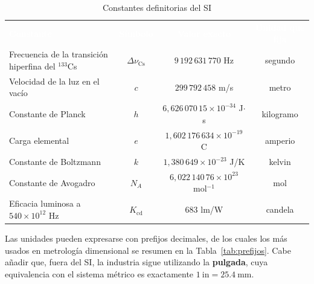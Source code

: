 \documentclass[12pt,a4paper]{article}
\newcommand{\encab}[1]{\textcolor{white}{\sffamily\bfseries #1}}
\begin{document}
\begin{table}[!htb]
	\centering
	\caption{Constantes definitorias del SI}\label{tab:constantes}
	\small
	\begin{tabularx}{\linewidth}{>{\raggedright\arraybackslash}X c c c}
		\rowcolor{darkblue}
		\encab{Constante}                                    & \encab{Símbolo}
		                                                     & \encab{Valor exacto}
		                                                     & \encab{Unidad que
			                                                       fija}
		\\
		Frecuencia de la transición hiperfina del $^{133}$Cs &
		$\Delta\nu_{\mathrm{Cs}}$                            & $9\,192\,631\,770$ Hz
		                                                     & segundo
		\\
		Velocidad de la luz en el vacío                      & $c$
		                                                     & $299\,792\,458$ m/s
		                                                     & metro
		\\
		Constante de Planck                                  & $h$
		                                                     &
		$6{,}626\,070\,15\times10^{-34}$ J$\cdot$s           & kilogramo
		\\
		Carga elemental                                      & $e$
		                                                     &
		$1{,}602\,176\,634\times10^{-19}$ C                  & amperio
		\\
		Constante de Boltzmann                               & $k$
		                                                     &
		$1{,}380\,649\times10^{-23}$ J/K                     & kelvin
		\\
		Constante de Avogadro                                & $N_A$
		                                                     &
		$6{,}022\,140\,76\times10^{23}$ mol$^{-1}$           & mol
		\\
		Eficacia luminosa a $540\times10^{12}$ Hz            & $K_{\mathrm{cd}}$
		                                                     & $683$ lm/W            &
		candela
		\\
	\end{tabularx}
\end{table}

\vspace{4pt}

Las unidades pueden expresarse con prefijos decimales, de los cuales los más
usados en metrología dimensional se resumen en la Tabla~\ref{tab:prefijos}. Cabe
añadir que, fuera del SI, la industria sigue utilizando la \textbf{pulgada},
cuya equivalencia con el sistema métrico es exactamente $1\ \text{in} =
	\SI{25.4}{\milli\metre}$.\\[-4pt]
\end{document}
